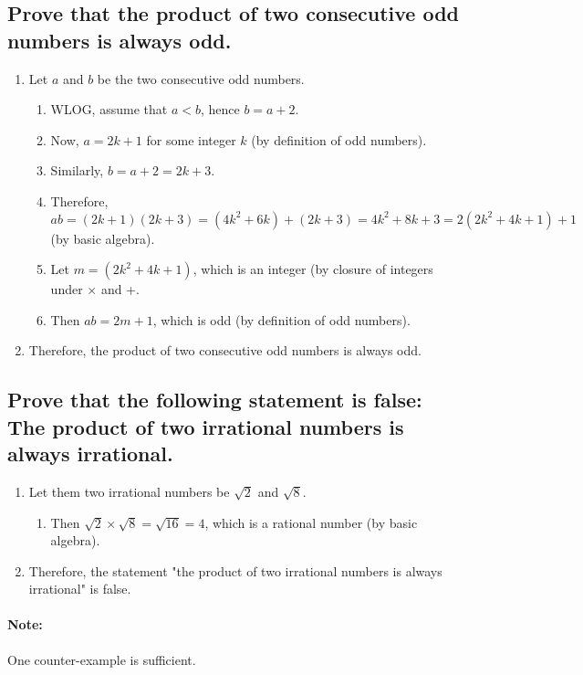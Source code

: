 \documentclass{article}
\begin{document}
\subsection*{Prove that the product of two consecutive odd numbers is always odd.}
\begin{enumerate}
    \item Let $a$ and $b$ be the two consecutive odd numbers. 
    \begin{enumerate}
        \item WLOG, assume that $a<b$, hence $b=a+2$.
        \item Now, $a=2k+1$ for some integer $k$ (by definition of odd numbers).
        \item Similarly, $b=a+2=2k+3$.
        \item Therefore, $ab=(2k+1)(2k+3)=(4k^2+6k)+(2k+3)=4k^2+8k+3=2(2k^2+4k+1)+1$ (by basic algebra).
        \item Let $m=(2k^2+4k+1)$, which is an integer (by closure of integers under $\times$ and +. 
        \item Then $ab=2m+1$, which is odd (by definition of odd numbers).
    \end{enumerate}
    \item Therefore, the product of two consecutive odd numbers is always odd.
\end{enumerate}
\vspace{0.1cm}

\subsection*{Prove that the following statement is false: The product of two irrational numbers is always irrational.}
\begin{enumerate}
    \item Let them two irrational numbers be $\sqrt{2}$ and $\sqrt{8}$. 
    \begin{enumerate}
        \item Then $\sqrt{2}\times\sqrt{8}=\sqrt{16}=4$, which is a rational number (by basic algebra).
    \end{enumerate}
    \item Therefore, the statement "the product of two irrational numbers is always irrational" is false.
\end{enumerate}
\paragraph{Note:}One counter-example is sufficient. 
\vspace{0.1cm}
\end{document}
